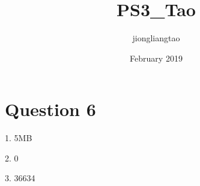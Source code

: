 \documentclass{article}
\title{PS3_Tao}
\author{jiongliangtao }
\date{February 2019}
\begin{document}
\maketitle

\section{Question 6}
1. 5MB

2. 0

3. 36634
\end{document}
